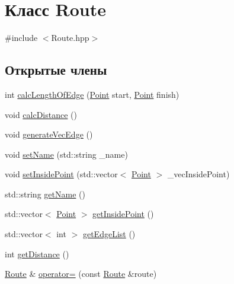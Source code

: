 \hypertarget{class_route}{}\section{Класс Route}
\label{class_route}


{\ttfamily \#include $<$Route.\+hpp$>$}

\subsection*{Открытые члены}
\begin{DoxyCompactItemize}
\item 
int \hyperlink{class_route_a3a42d0ecdba9a716884f3f258a906cdd}{calc\+Length\+Of\+Edge} (\hyperlink{class_point}{Point} start, \hyperlink{class_point}{Point} finish)
\item 
void \hyperlink{class_route_a8919ddfcd64219d7635fdf13eebba617}{calc\+Distance} ()
\item 
void \hyperlink{class_route_a740bdd3ca221a378061511b462829fe9}{generate\+Vec\+Edge} ()
\item 
void \hyperlink{class_route_aa897e0be7471d42af9a638e2665bd055}{set\+Name} (std\+::string \+\_\+name)
\item 
void \hyperlink{class_route_af3241c7833b6062dde3cd145c4193f01}{set\+Inside\+Point} (std\+::vector$<$ \hyperlink{class_point}{Point} $>$ \+\_\+vec\+Inside\+Point)
\item 
std\+::string \hyperlink{class_route_a05cef7cb5d15f6a9028b24ff3eec2da0}{get\+Name} ()
\item 
std\+::vector$<$ \hyperlink{class_point}{Point} $>$ \hyperlink{class_route_a22238d31fd4958d705b459c640c3db0d}{get\+Inside\+Point} ()
\item 
std\+::vector$<$ int $>$ \hyperlink{class_route_a7012434b20ade0167b5430b3d5de4421}{get\+Edge\+List} ()
\item 
int \hyperlink{class_route_af90912500d799fd026ec7d6d35d20555}{get\+Distance} ()
\item 
\hyperlink{class_route}{Route} \& \hyperlink{class_route_a41b589dc05cbb8a6399b934545f71731}{operator=} (const \hyperlink{class_route}{Route} \&route)
\end{DoxyCompactItemize}
